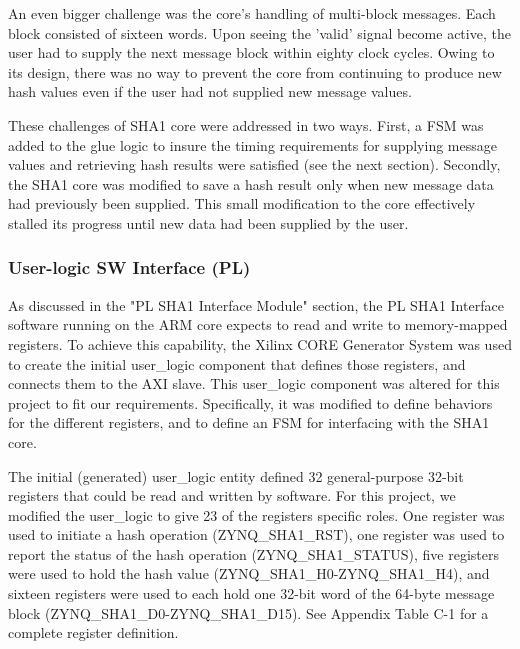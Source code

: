 \documentclass[journal]{IEEEtran}
\begin{document}
An even bigger challenge was the core's handling of multi-block messages. Each block consisted of sixteen words. Upon seeing the 'valid' signal become active, the user had to supply the next message block within eighty clock cycles. Owing to its design, there was no way to prevent the core from continuing to produce new hash values even if the user had not supplied new message values.

These challenges of SHA1 core were addressed in two ways. First, a FSM was added to the glue logic to insure the timing requirements for supplying message values and retrieving hash results were satisfied (see the next section). Secondly, the SHA1 core was modified to save a hash result only when new message data had previously been supplied.  This small modification to the core effectively stalled its progress until new data had been supplied by the user.
\subsubsection{User-logic SW Interface (PL)}
As discussed in the "PL SHA1 Interface Module" section, the PL SHA1 Interface software running on the ARM core expects to read and write to memory-mapped registers.  To achieve this capability, the Xilinx CORE Generator System was used to create the initial user\_logic component that defines those registers, and connects them to the AXI slave.  This user\_logic component was altered for this project to fit our requirements.  Specifically, it was modified to define behaviors for the different registers, and to define an FSM for interfacing with the SHA1 core. 

The initial (generated) user\_logic entity defined 32 general-purpose 32-bit registers that could be read and written by software.  For this project, we modified the user\_logic to give 23 of the registers specific roles.  One register was used to initiate a hash operation (ZYNQ\_SHA1\_RST), one register was used to report the status of the hash operation (ZYNQ\_SHA1\_STATUS), five registers were used to hold the hash value (ZYNQ\_SHA1\_H0-ZYNQ\_SHA1\_H4), and sixteen registers were used to each hold one 32-bit word of the 64-byte message block (ZYNQ\_SHA1\_D0-ZYNQ\_SHA1\_D15).  See Appendix Table C-1 for a complete register definition. 
\end{document}
